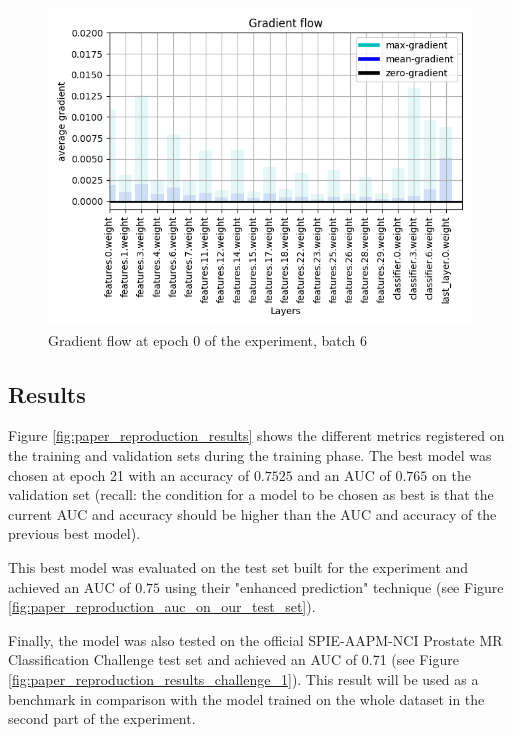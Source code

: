 \begin{figure}[!h]
\centering
\includegraphics[width=1\textwidth, keepaspectratio=true]{./figures/gradient_flow.png}
\caption{Gradient flow at epoch 0 of the experiment, batch 6}
\label{fig:gradient_flow}
\end{figure}


\subsection{Results}
\label{sec:paper_reproduction_results}
\setlength{\marginparwidth}{3cm}\leavevmode {}Figure \ref{fig:paper_reproduction_results} shows the different metrics registered on the training and validation sets during the training phase. The best model was chosen at epoch 21 with an accuracy of $0.7525$ and an AUC of $0.765$ on the validation set (recall: the condition for a model to be chosen as best is that the current AUC and accuracy should be higher than the AUC and accuracy of the previous best model).

\noindent This best model was evaluated on the test set built for the experiment and achieved an AUC of $0.75$ using their "enhanced prediction" technique (see Figure \ref{fig:paper_reproduction_auc_on_our_test_set}).

Finally, the model was also tested on the official SPIE-AAPM-NCI Prostate MR Classification Challenge test set and achieved an AUC of 0.71 (see Figure \ref{fig:paper_reproduction_results_challenge_1}). This result will be used as a benchmark in comparison with the model trained on the whole dataset in the second part of the experiment.

